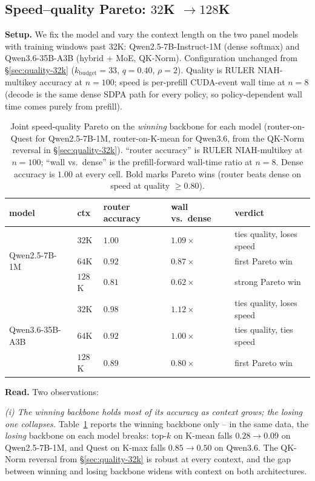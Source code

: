 \documentclass[11pt]{article}
\theoremstyle{remark}
\newcommand{\kbudget}{k_{\text{budget}}}
\begin{document}
\subsection{Speed--quality Pareto: $32$K $\to 128$K}\label{sec:pareto}

\textbf{Setup.} We fix the model and vary the context length on the two panel models with training windows past 32K: Qwen2.5-7B-Instruct-1M (dense softmax) and Qwen3.6-35B-A3B (hybrid + MoE, QK-Norm). Configuration unchanged from \S\ref{sec:quality-32k} ($\kbudget=33$, $q=0.40$, $\rho=2$). Quality is RULER NIAH-multikey accuracy at $n=100$; speed is per-prefill CUDA-event wall time at $n=8$ (decode is the same dense SDPA path for every policy, so policy-dependent wall time comes purely from prefill).

\begin{table}[h]
\centering\small
\caption{Joint speed-quality Pareto on the \emph{winning} backbone for each model (router-on-Quest for Qwen2.5-7B-1M, router-on-K-mean for Qwen3.6, from the QK-Norm reversal in \S\ref{sec:quality-32k}). ``router accuracy'' is RULER NIAH-multikey at $n=100$; ``wall vs.\ dense'' is the prefill-forward wall-time ratio at $n=8$. Dense accuracy is $1.00$ at every cell. Bold marks Pareto wins (router beats dense on speed at quality $\ge 0.80$).}\label{tab:pareto}
\begin{tabular}{lllll}
\toprule
model & ctx & router accuracy & wall vs.\ dense & verdict \\
\midrule
\multirow{3}{*}{Qwen2.5-7B-1M}
 & $32$K  & $1.00$           & $1.09\times$ & ties quality, loses speed \\
 & $64$K  & $\mathbf{0.92}$  & $\mathbf{0.87\times}$ & first Pareto win \\
 & $128$K & $\mathbf{0.81}$  & $\mathbf{0.62\times}$ & strong Pareto win \\
\midrule
\multirow{3}{*}{Qwen3.6-35B-A3B}
 & $32$K  & $0.98$           & $1.12\times$ & ties quality, loses speed \\
 & $64$K  & $0.92$           & $1.00\times$ & ties quality, ties speed \\
 & $128$K & $\mathbf{0.89}$  & $\mathbf{0.80\times}$ & first Pareto win \\
\bottomrule
\end{tabular}
\end{table}

\textbf{Read.} Two observations:

\emph{(i) The winning backbone holds most of its accuracy as context grows; the losing one collapses.} Table~\ref{tab:pareto} reports the winning backbone only -- in the same data, the \emph{losing} backbone on each model breaks: top-$k$ on K-mean falls $0.28 \to 0.09$ on Qwen2.5-7B-1M, and Quest on K-max falls $0.85 \to 0.50$ on Qwen3.6. The QK-Norm reversal from \S\ref{sec:quality-32k} is robust at every context, and the gap between winning and losing backbone widens with context on both architectures.
\end{document}
